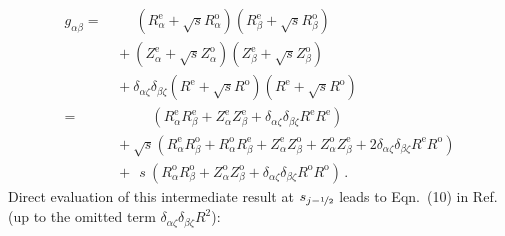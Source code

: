 \begin{align}
  g_{\alpha \beta} =&\, \phantom{+}\, \left( R_\alpha^\mathrm{e} + \sqrt{s} R_\alpha^\mathrm{o} \right) \left( R_\beta^\mathrm{e} + \sqrt{s} R_\beta^\mathrm{o} \right) \nonumber \\
                   ~&\,          +    \left( Z_\alpha^\mathrm{e} + \sqrt{s} Z_\alpha^\mathrm{o} \right) \left( Z_\beta^\mathrm{e} + \sqrt{s} Z_\beta^\mathrm{o} \right) \nonumber \\
                   ~&\,          +    \delta_{\alpha \zeta} \delta_{\beta \zeta} \left( R^\mathrm{e} + \sqrt{s} R^\mathrm{o} \right) \left( R^\mathrm{e} + \sqrt{s} R^\mathrm{o} \right) \nonumber \\
                   =&\, \phantom{+ \sqrt{s}}~ \left(   R_\alpha^\mathrm{e} R_\beta^\mathrm{e} + Z_\alpha^\mathrm{e} Z_\beta^\mathrm{e}
                                                     + \delta_{\alpha \zeta} \delta_{\beta \zeta} R^\mathrm{e} R^\mathrm{e} \right) \nonumber \\
                   ~&\,          + \sqrt{s}   \left(   R_\alpha^\mathrm{e} R_\beta^\mathrm{o} + R_\alpha^\mathrm{o} R_\beta^\mathrm{e}
                                                     + Z_\alpha^\mathrm{e} Z_\beta^\mathrm{o} + Z_\alpha^\mathrm{o} Z_\beta^\mathrm{e}
                                                     + 2 \delta_{\alpha \zeta} \delta_{\beta \zeta} R^\mathrm{e} R^\mathrm{o} \right) \nonumber \\
                   ~&\,          + ~~s~       \left(   R_\alpha^\mathrm{o} R_\beta^\mathrm{o} + Z_\alpha^\mathrm{o} Z_\beta^\mathrm{o}
                                                     + \delta_{\alpha \zeta} \delta_{\beta \zeta} R^\mathrm{o} R^\mathrm{o} \right) \, . \label{eqn:metric_elements_evenodd}
\end{align}
Direct evaluation of this intermediate result at $s_{j-\nicefrac{1}{2}}$ leads to Eqn.~(10) in Ref.~\cite{hirshman_schwenn_nuehrenberg_1990}
(up to the omitted term $\delta_{\alpha \zeta} \delta_{\beta \zeta} R^2$):
